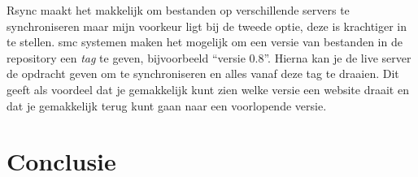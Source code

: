 \documentclass[12pt,a4paper]{article}
\begin{document}
    Rsync maakt het makkelijk om bestanden op verschillende servers te synchroniseren maar mijn voorkeur ligt bij de tweede optie, deze is krachtiger in te stellen.
    {\sc smc} systemen maken het mogelijk om een versie van bestanden in de repository een \emph{tag} te geven, bijvoorbeeld ``versie 0.8''. Hierna kan je de live server de opdracht geven om te synchroniseren en alles vanaf deze tag te draaien. Dit geeft als voordeel dat je gemakkelijk kunt zien welke versie een website draait en dat je gemakkelijk terug kunt gaan naar een voorlopende versie.
    
  \section{Conclusie}
\end{document}
